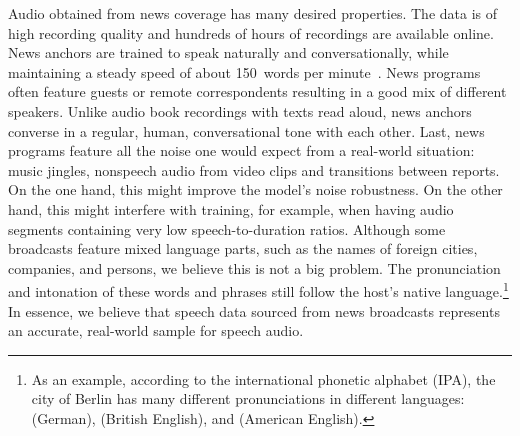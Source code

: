   	Audio obtained from news coverage has many desired properties. The data is of high recording quality and hundreds of hours of recordings are available online. News anchors are trained to speak naturally and conversationally, while maintaining a steady speed of about \num{150}~words per minute~\cite{Kantilaftis2016}. News programs often feature guests or remote correspondents resulting in a good mix of different speakers. Unlike audio book recordings with texts read aloud, news anchors converse in a regular, human, conversational tone with each other. Last, news programs feature all the noise one would expect from a real-world situation: music jingles, nonspeech audio from video clips and transitions between reports. On the one hand, this might improve the model's noise robustness. On the other hand, this might interfere with training, for example, when having audio segments containing very low speech-to-duration ratios. Although some broadcasts feature mixed language parts, such as the names of foreign cities, companies, and persons, we believe this is not a big problem. The pronunciation and intonation of these words and phrases still follow the host's native language.\footnote{As an example, according to the international phonetic alphabet (IPA), the city of Berlin has many different pronunciations in different languages:  (German),  (British English), and  (American English).} In essence, we believe that speech data sourced from news broadcasts represents an accurate, real-world sample for speech audio.

